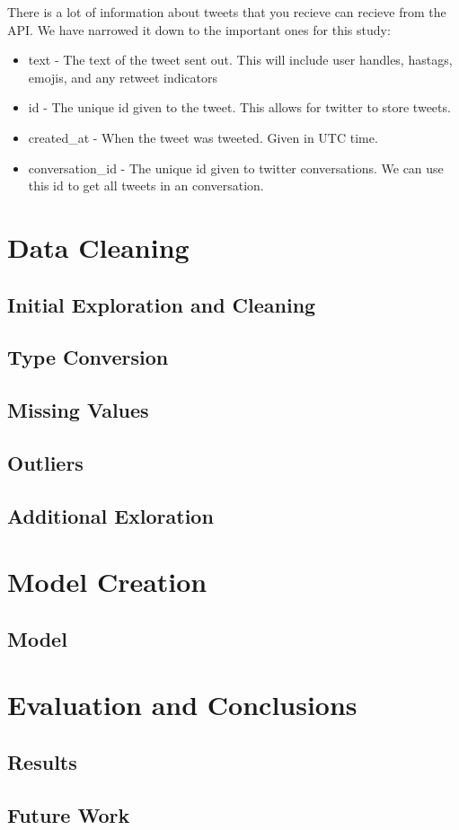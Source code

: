\documentclass[12pt]{article}
\begin{document}
        There is a lot of information about tweets that you recieve can recieve from the API. We have narrowed it down to the important ones for this study:
        \begin{itemize}
            \item text - The text of the tweet sent out. This will include user handles, hastags, emojis, and any retweet indicators
            \item id - The unique id given to the tweet. This allows for twitter to store tweets.
            \item created\_at - When the tweet was tweeted. Given in UTC time.
            \item conversation\_id - The unique id given to twitter conversations. We can use this id to get all tweets in an conversation.
        \end{itemize}
    \section{Data Cleaning}
        \subsection{Initial Exploration and Cleaning}
        \subsection{Type Conversion}
        \subsection{Missing Values}
        \subsection{Outliers}
        \subsection{Additional Exloration}
    \section{Model Creation}
        \subsection{Model}
    \section{Evaluation and Conclusions}
        \subsection{Results}
        \subsection{Future Work}
\end{document}
